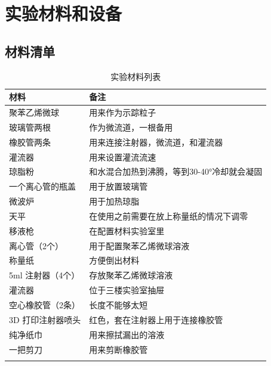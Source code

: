 \documentclass[12pt]{article}
\begin{document}
\section{实验材料和设备}
\subsection{材料清单}



{
    \footnotesize
    \begin{longtable}{@{} p{5cm} p{10cm} @{}}
        \toprule
        \textbf{材料} & \textbf{备注} \\ 
        \midrule
        
        
        聚苯乙烯微球        & 用来作为示踪粒子\\
        玻璃管两根          & 作为微流道，一根备用\\
        橡胶管两条              & 用来连接注射器，微流道，和灌流器 \\
        灌流器              & 用来设置灌流流速 \\
        琼脂粉              & 和水混合加热到沸腾，等到30-40°冷却就会凝固\\
        一个离心管的瓶盖    & 用于放置玻璃管\\
        微波炉              & 用于加热琼脂 \\
        天平                 & 在使用之前需要在放上称量纸的情况下调零 \\ 
        移液枪               & 在配置材料实验室里 \\ 
        离心管（2个）        & 用于配置聚苯乙烯微球溶液 \\ 
        称量纸               & 方便倒出材料   \\
        5ml 注射器（4个）    & 存放聚苯乙烯微球溶液 \\ 
        灌流器               & 位于三楼实验室抽屉 \\ 
        空心橡胶管（2条）    & 长度不能够太短 \\ 
        3D 打印注射器喷头    & 红色，套在注射器上用于连接橡胶管 \\ 
        纯净纸巾             & 用来擦拭漏出的溶液 \\ 
        
        一把剪刀            & 用来剪断橡胶管 \\
        
        \bottomrule
        \caption{实验材料列表} \\
    \end{longtable}
}
\end{document}
